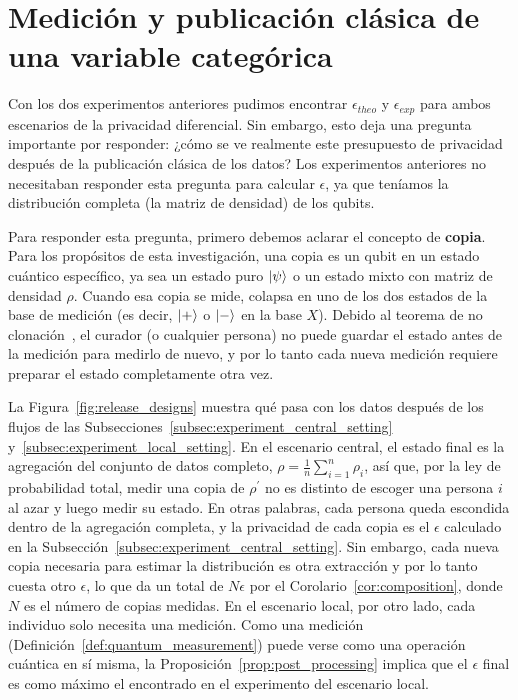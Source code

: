 \documentclass{ieeeaccess}
\begin{document}
\section{Medición y publicación clásica de una variable categórica}
\label{sec:measurement_release}

Con los dos experimentos anteriores pudimos encontrar $\epsilon_{theo}$ y $\epsilon_{exp}$ para ambos escenarios de la privacidad diferencial. Sin embargo, esto deja una pregunta importante por responder: ¿cómo se ve realmente este presupuesto de privacidad después de la publicación clásica de los datos? Los experimentos anteriores no necesitaban responder esta pregunta para calcular $\epsilon$, ya que teníamos la distribución completa (la matriz de densidad) de los qubits.

Para responder esta pregunta, primero debemos aclarar el concepto de \textbf{copia}. Para los propósitos de esta investigación, una copia es un qubit en un estado cuántico específico, ya sea un estado puro $\ket{\psi}$ o un estado mixto con matriz de densidad $\rho$. Cuando esa copia se mide, colapsa en uno de los dos estados de la base de medición (es decir, $\ket{+}$ o $\ket{-}$ en la base $X$). Debido al teorema de no clonación~\cite{watrous_limitations}, el curador (o cualquier persona) no puede guardar el estado antes de la medición para medirlo de nuevo, y por lo tanto cada nueva medición requiere preparar el estado completamente otra vez.

La Figura~\ref{fig:release_designs} muestra qué pasa con los datos después de los flujos de las Subsecciones~\ref{subsec:experiment_central_setting} y~\ref{subsec:experiment_local_setting}. En el escenario central, el estado final es la agregación del conjunto de datos completo, $\rho = \frac{1}{n}\sum_{i=1}^{n}\rho_i$, así que, por la ley de probabilidad total, medir una copia de $\rho^{\prime}$ no es distinto de escoger una persona $i$ al azar y luego medir su estado. En otras palabras, cada persona queda escondida dentro de la agregación completa, y la privacidad de cada copia es el $\epsilon$ calculado en la Subsección~\ref{subsec:experiment_central_setting}. Sin embargo, cada nueva copia necesaria para estimar la distribución es otra extracción y por lo tanto cuesta otro $\epsilon$, lo que da un total de $N\epsilon$ por el Corolario~\ref{cor:composition}, donde $N$ es el número de copias medidas. En el escenario local, por otro lado, cada individuo solo necesita una medición. Como una medición (Definición~\ref{def:quantum_measurement}) puede verse como una operación cuántica en sí misma, la Proposición~\ref{prop:post_processing} implica que el $\epsilon$ final es como máximo el encontrado en el experimento del escenario local.
\end{document}
